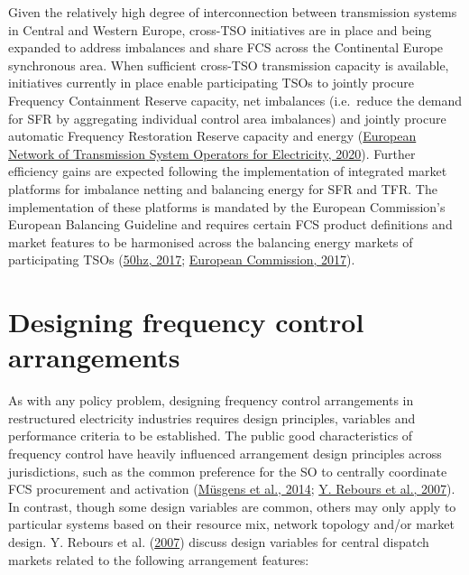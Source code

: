 \documentclass[12pt,a4paper,]{report}
\begin{document}
Given the relatively high degree of interconnection between transmission
systems in Central and Western Europe, cross-TSO initiatives are in
place and being expanded to address imbalances and share FCS across the
Continental Europe synchronous area. When sufficient cross-TSO
transmission capacity is available, initiatives currently in place
enable participating TSOs to jointly procure Frequency Containment
Reserve capacity, net imbalances (i.e.~reduce the demand for SFR by
aggregating individual control area imbalances) and jointly procure
automatic Frequency Restoration Reserve capacity and energy
(\protect\hyperlink{ref-europeannetworkoftransmissionsystemoperatorsforelectricityentso-eENTSOEBalancingReport2020}{European
Network of Transmission System Operators for Electricity, 2020}).
Further efficiency gains are expected following the implementation of
integrated market platforms for imbalance netting and balancing energy
for SFR and TFR. The implementation of these platforms is mandated by
the European Commission's European Balancing Guideline and requires
certain FCS product definitions and market features to be harmonised
across the balancing energy markets of participating TSOs
(\protect\hyperlink{ref-50hzamprionapgeliartetennetConsultationDesignPlatform2017}{50hz,
2017};
\protect\hyperlink{ref-europeancommissionCommissionRegulationEU2017}{European
Commission, 2017}).

\hypertarget{sec:fcs-design}{%
\section{Designing frequency control
arrangements}\label{sec:fcs-design}}

As with any policy problem, designing frequency control arrangements in
restructured electricity industries requires design principles,
variables and performance criteria to be established. The public good
characteristics of frequency control have heavily influenced arrangement
design principles across jurisdictions, such as the common preference
for the SO to centrally coordinate FCS procurement and activation
(\protect\hyperlink{ref-musgensEconomicsDesignBalancing2014}{Müsgens et
al., 2014};
\protect\hyperlink{ref-reboursFundamentalDesignIssues2007}{Y. Rebours et
al., 2007}). In contrast, though some design variables are common,
others may only apply to particular systems based on their resource mix,
network topology and/or market design. Y. Rebours et al.
(\protect\hyperlink{ref-reboursFundamentalDesignIssues2007}{2007})
discuss design variables for central dispatch markets related to the
following arrangement features:
\end{document}
